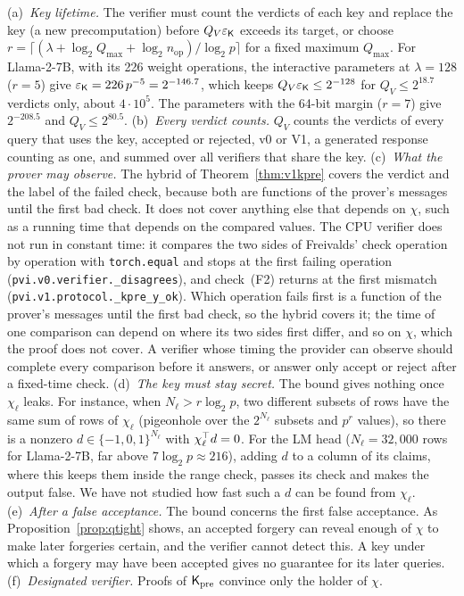 \begin{remark}
\label{rem:stateful}
(a)~\emph{Key lifetime.} The verifier must count the verdicts of each key and replace the key (a new
precomputation) before $Q_V\varepsilon_{\mathsf{K}}$ exceeds its target, or choose
$r=\lceil(\lambda+\log_2Q_{\max}+\log_2n_{\mathrm{op}})/\log_2p\rceil$ for a fixed maximum
$Q_{\max}$. For Llama-2-7B, with its 226 weight operations, the interactive parameters at
$\lambda=128$ ($r=5$) give $\varepsilon_{\mathsf{K}}=226\,p^{-5}=2^{-146.7}$, which keeps
$Q_V\varepsilon_{\mathsf{K}}\le2^{-128}$ for $Q_V\le2^{18.7}$ verdicts only, about $4\cdot10^5$. The
parameters with the 64-bit margin ($r=7$) give $2^{-208.5}$ and $Q_V\le2^{80.5}$.
(b)~\emph{Every verdict counts.} $Q_V$ counts the verdicts of every query that uses the key, accepted
or rejected, v0 or V1, a generated response counting as one, and summed over all verifiers that
share the key.
(c)~\emph{What the prover may observe.} The hybrid of Theorem~\ref{thm:v1kpre} covers the verdict and
the label of the failed check, because both are functions of the prover's messages until the first
bad check. It does not cover anything else that depends on $\chi$, such as a running time that
depends on the compared values. The CPU verifier does not run in constant time: it compares the two
sides of Freivalds' check operation by operation with \texttt{torch.equal} and stops at the first
failing operation (\texttt{pvi.v0.verifier.\_disagrees}), and check~(F2) returns at the first mismatch
(\texttt{pvi.v1.protocol.\_kpre\_y\_ok}). Which operation fails first is a function of the prover's
messages until the first bad check, so the hybrid covers it; the time of one comparison can depend on
where its two sides first differ, and so on $\chi$, which the proof does not cover. A verifier whose
timing the provider can observe should complete every comparison before it answers, or answer only
accept or reject after a fixed-time check.
(d)~\emph{The key must stay secret.} The bound gives nothing once $\chi_\ell$ leaks. For instance,
when $N_\ell>r\log_2p$, two different subsets of rows have the same sum of rows of $\chi_\ell$
(pigeonhole over the $2^{N_\ell}$ subsets and $p^r$ values), so there is a nonzero
$d\in\{-1,0,1\}^{N_\ell}$ with $\chi_\ell^\top d=0$. For the LM head ($N_\ell=32{,}000$ rows for
Llama-2-7B, far above $7\log_2p\approx216$), adding $d$ to a column of its claims, where this keeps
them inside the range check, passes its check and makes the output false. We have not studied how
fast such a $d$ can be found from $\chi_\ell$.
(e)~\emph{After a false acceptance.} The bound concerns the first false acceptance. As
Proposition~\ref{prop:qtight} shows, an accepted forgery can reveal enough of $\chi$ to make later
forgeries certain, and the verifier cannot detect this. A key under which a forgery may have been
accepted gives no guarantee for its later queries.
(f)~\emph{Designated verifier.} Proofs of $\mathsf{K}_{\mathrm{pre}}$ convince only the holder of $\chi$.
\end{remark}

